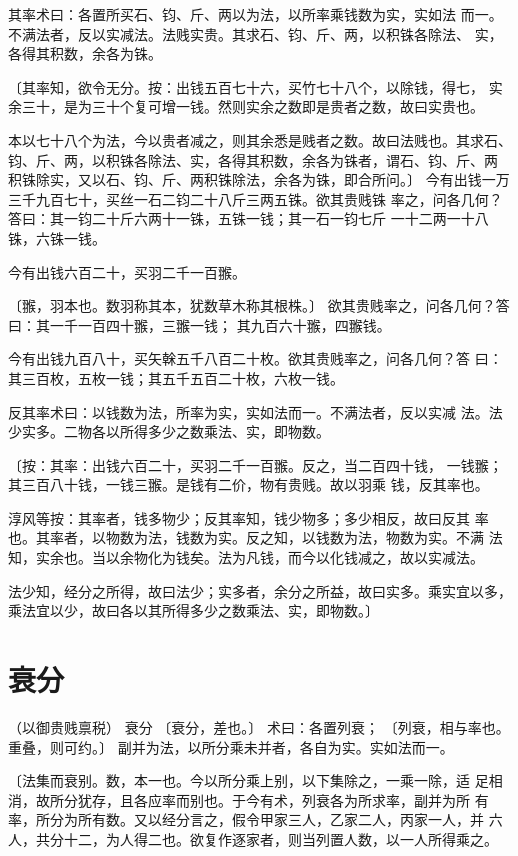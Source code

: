 \documentclass[12pt,UTF8]{ctexbook}
\begin{document}
其率术曰：各置所买石、钧、斤、两以为法，以所率乘钱数为实，实如法 而一。不满法者，反以实减法。法贱实贵。其求石、钧、斤、两，以积铢各除法、 实，各得其积数，余各为铢。

〔其率知，欲令无分。按：出钱五百七十六，买竹七十八个，以除钱，得七， 实余三十，是为三十个复可增一钱。然则实余之数即是贵者之数，故曰实贵也。

本以七十八个为法，今以贵者减之，则其余悉是贱者之数。故曰法贱也。其求石、 钧、斤、两，以积铢各除法、实，各得其积数，余各为铢者，谓石、钧、斤、两 积铢除实，又以石、钧、斤、两积铢除法，余各为铢，即合所问。〕 今有出钱一万三千九百七十，买丝一石二钧二十八斤三两五铢。欲其贵贱铢 率之，问各几何？答曰：其一钧二十斤六两十一铢，五铢一钱；其一石一钧七斤 一十二两一十八铢，六铢一钱。

今有出钱六百二十，买羽二千一百翭。

〔翭，羽本也。数羽称其本，犹数草木称其根株。〕 欲其贵贱率之，问各几何？答曰：其一千一百四十翭，三翭一钱； 其九百六十翭，四翭钱。

今有出钱九百八十，买矢榦五千八百二十枚。欲其贵贱率之，问各几何？答 曰：其三百枚，五枚一钱；其五千五百二十枚，六枚一钱。

反其率术曰：以钱数为法，所率为实，实如法而一。不满法者，反以实减 法。法少实多。二物各以所得多少之数乘法、实，即物数。

〔按：其率：出钱六百二十，买羽二千一百翭。反之，当二百四十钱， 一钱翭；其三百八十钱，一钱三翭。是钱有二价，物有贵贱。故以羽乘 钱，反其率也。

淳风等按：其率者，钱多物少；反其率知，钱少物多；多少相反，故曰反其 率也。其率者，以物数为法，钱数为实。反之知，以钱数为法，物数为实。不满 法知，实余也。当以余物化为钱矣。法为凡钱，而今以化钱减之，故以实减法。

法少知，经分之所得，故曰法少；实多者，余分之所益，故曰实多。乘实宜以多， 乘法宜以少，故曰各以其所得多少之数乘法、实，即物数。〕

\chapter{衰分}
（以御贵贱禀税） 衰分 〔衰分，差也。〕 术曰：各置列衰； 〔列衰，相与率也。重叠，则可约。〕 副并为法，以所分乘未并者，各自为实。实如法而一。

〔法集而衰别。数，本一也。今以所分乘上别，以下集除之，一乘一除，适 足相消，故所分犹存，且各应率而别也。于今有术，列衰各为所求率，副并为所 有率，所分为所有数。又以经分言之，假令甲家三人，乙家二人，丙家一人，并 六人，共分十二，为人得二也。欲复作逐家者，则当列置人数，以一人所得乘之。
\end{document}
